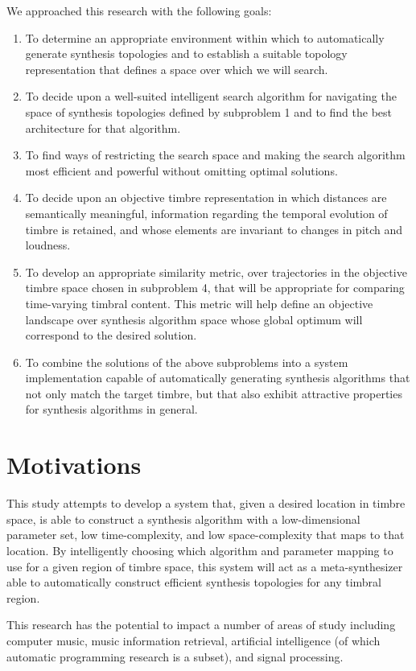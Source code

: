 \documentclass[12pt]{report} 	%
\numberwithin{figure}{chapter}
\numberwithin{table}{chapter}
\numberwithin{equation}{chapter}
\begin{document}
\begin{flushleft}
We approached this research with the following goals:
\begin{enumerate}
\item To determine an appropriate environment within which to automatically generate synthesis topologies and to establish a suitable topology representation that defines a space over which we will search.
\item To decide upon a well-suited intelligent search algorithm for navigating the space of synthesis topologies defined by subproblem 1 and to find the best architecture for that algorithm.
\item To find ways of restricting the search space and making the search algorithm most efficient and powerful without omitting optimal solutions.
\item To decide upon an objective timbre representation in which distances are semantically meaningful, information regarding the temporal evolution of timbre is retained, and whose elements are invariant to changes in pitch and loudness.
\item To develop an appropriate similarity metric, over trajectories in the objective timbre space chosen in subproblem 4, that will be appropriate for comparing time-varying timbral content. This metric will help define an objective landscape over synthesis algorithm space whose global optimum will correspond to the desired solution.
\item To combine the solutions of the above subproblems into a system implementation capable of automatically generating synthesis algorithms that not only match the target timbre, but that also exhibit attractive properties for synthesis algorithms in general.
\end{enumerate}

\section{Motivations}
This study attempts to develop a system that, given a desired location in timbre space, is able to construct a synthesis algorithm with a low-dimensional parameter set, low time-complexity, and low space-complexity that maps to that location. By intelligently choosing which algorithm and parameter mapping to use for a given region of timbre space, this system will act as a meta-synthesizer able to automatically construct efficient synthesis topologies for any timbral region.

This research has the potential to impact a number of areas of study including computer music, music information retrieval, artificial intelligence (of which automatic programming research is a subset), and signal processing.


\end{flushleft}
\end{document}
